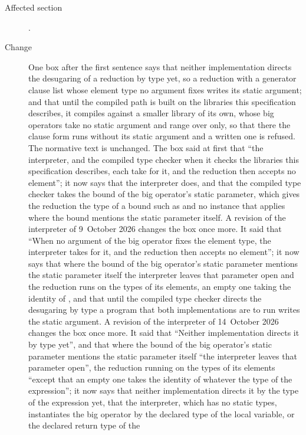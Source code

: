 \begin{description}
\item[Affected section] .
\item[Change] One box after the first sentence says that neither implementation
directs the desugaring of a reduction by type yet, so a reduction with a
generator clause list whose element type no argument fixes writes its static
argument; and that until the compiled path is built on the libraries this
specification describes, it compiles against a smaller library of its own,
whose big operators take no static argument and range over 
only, so that there the clause form runs without its static argument and a
written one is refused. The normative text is unchanged.
The box said at first that ``the interpreter, and the compiled type checker
when it checks the libraries this specification describes, each take
 for it, and the reduction then accepts no element''; it now
says that the interpreter does, and that the compiled type checker takes the
bound of the big operator's static parameter, which gives the reduction the
type of a bound such as  and no instance that applies where the
bound mentions the static parameter itself.
A revision of the interpreter of 9~October 2026 changes the box once more.
It said that ``When no argument of the big operator fixes the element type, the
interpreter takes  for it, and the reduction then accepts no
element''; it now says that where the bound of the big operator's static
parameter mentions the static parameter itself the interpreter leaves that
parameter open and the reduction runs on the types of its elements, an empty
one taking the identity of , and that until the compiled
type checker directs the desugaring by type a program that both implementations
are to run writes the static argument.
A revision of the interpreter of 14~October 2026 changes the box once more.
It said that ``Neither implementation directs it by type yet'', and that where
the bound of the big operator's static parameter mentions the static parameter
itself ``the interpreter leaves that parameter open'', the reduction running on
the types of its elements ``except that an empty one takes the identity of
 whatever the type of the expression''; it now says that
neither implementation directs it by the type  of the expression yet,
that the interpreter, which has no static types, instantiates the big operator
by the declared type of the local variable, or the declared return type of the

\end{description}
